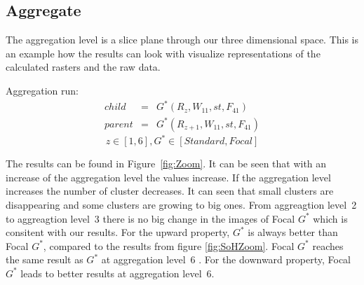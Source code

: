 \documentclass{itatnew}
\begin{document}
\subsection{Aggregate}

The aggregation level is a slice plane through our three dimensional space. 
This is an example how the results can look with visualize representations of the calculated 
rasters and the raw data.
\begin{definition} Aggregation run:
\begin{eqnarray*}
    child & = & G^*(R_z, W_{11}, st, F_{41}) \\
    parent & = & G^*(R_{z+1}, W_{11}, st, F_{41})
  \end{eqnarray*}
\begin{displaymath}
z \in [1,6], G^* \in [Standard, Focal]
\end{displaymath}
\end{definition}

The results can be found in Figure~\ref{fig:Zoom}. It can be seen that with an
increase of the aggregation level the values increase. 
If the aggregation level increases the number of cluster decreases. It can seen that
small clusters are disappearing and some clusters are growing to big ones. From aggreagtion level~2 to
aggreagtion level~3 there is no big change in the images of Focal $G^*$ which is consitent with our results.
For the upward property, $G^*$ is always better than Focal
$G^*$, compared to the results from figure \ref{fig:SoHZoom}. Focal $G^*$
reaches the same result as $G^*$ at aggregation level~6 . For the downward
property, Focal $G^*$ leads to better results at aggregation level~6. 
\end{document}
